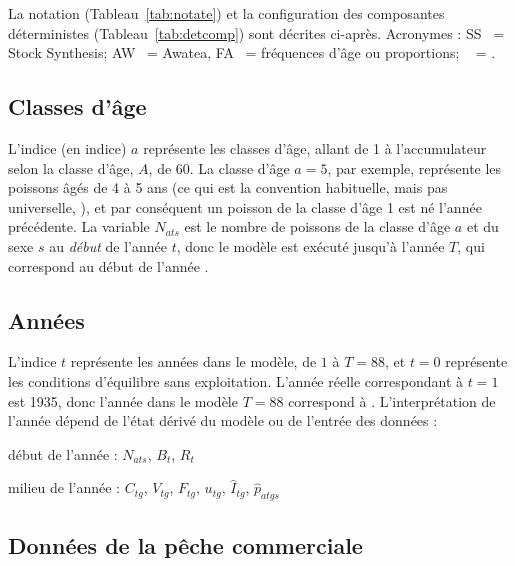 \documentclass[11pt]{book}
\begin{document}
La notation (Tableau~\ref{tab:notate}) et la configuration des composantes d\'{e}terministes (Tableau~\ref{tab:detcomp}) sont d\'{e}crites ci-apr\`{e}s. Acronymes : SS~ = Stock Synthesis; AW~ = Awatea, FA~ = fr\'{e}quences d'\^{a}ge ou proportions; \spc~ = \spn.


\subsection{Classes d'\^{a}ge}

L'indice (en indice) $a$ repr\'{e}sente les classes d'\^{a}ge, allant de 1 \`{a} l'accumulateur selon la classe d'\^{a}ge, $A$, de 60.
La classe d'\^{a}ge $a = 5$, par exemple, repr\'{e}sente les poissons \^{a}g\'{e}s de 4 \`{a} 5 ans (ce qui est la convention habituelle, mais pas universelle, \citealt{Caswell:2001}), et par cons\'{e}quent un poisson de la classe d'\^{a}ge 1 est n\'{e} l'ann\'{e}e pr\'{e}c\'{e}dente.
La variable $N_{ats}$ est le nombre de poissons de la classe d'\^{a}ge $a$ et du sexe $s$ au \textit{d\'{e}but} de l'ann\'{e}e $t$, donc le mod\`{e}le est ex\'{e}cut\'{e} jusqu'\`{a} l'ann\'{e}e $T$, qui correspond au d\'{e}but de l'ann\'{e}e \finalYr.

\subsection{Ann\'{e}es}

L'indice $t$ repr\'{e}sente les ann\'{e}es dans le mod\`{e}le, de $1$ \`{a} $T=88$, et $t=0$ repr\'{e}sente les conditions d'\'{e}quilibre sans exploitation.
L'ann\'{e}e r\'{e}elle correspondant \`{a} $t=1$ est 1935, donc l'ann\'{e}e dans le mod\`{e}le $T=88$ correspond \`{a} \finalYr.
L'interpr\'{e}tation de l'ann\'{e}e d\'{e}pend de l'\'{e}tat d\'{e}riv\'{e} du mod\`{e}le ou de l'entr\'{e}e des donn\'{e}es :
\begin{itemize_csas}{}{}
\item d\'{e}but de l'ann\'{e}e : $N_{ats}$, $B_t$, $R_t$
\item milieu de l'ann\'{e}e : $C_{tg}$, $V_{tg}$, $F_{tg}$, $u_{tg}$, $\widehat{I}_{tg}$, $\widehat{p}_{atgs}$
\end{itemize_csas}

\subsection{Donn\'{e}es de la p\^{e}che commerciale}
\end{document}
